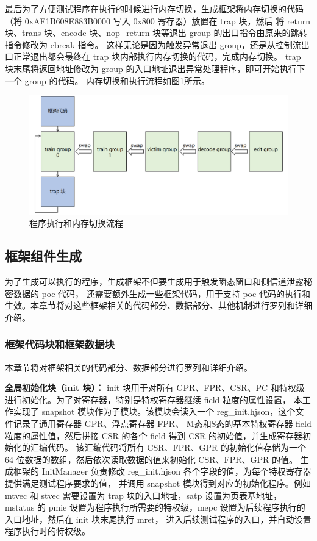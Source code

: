 最后为了方便测试程序在执行的时候进行内存切换，生成框架将内存切换的代码（将 0xAF1B608E883B0000 写入 0x800 寄存器）放置在 trap 块，然后
将 return 块、trans 块、encode 块、nop\_return 块等退出 group 的出口指令由原来的跳转指令修改为 ebreak 指令。
这样无论是因为触发异常退出 group，还是从控制流出口正常退出都会最终在 trap 块内部执行内存切换的代码，完成内存切换。
trap 块末尾将返回地址修改为 group 的入口地址退出异常处理程序，即可开始执行下一个 group 的代码。
内存切换和执行流程如图\ref{paper:execute-flow}所示。\par

\begin{figure}[!h]
    \centering
    \includegraphics[width=\linewidth]{figure/paper/execute-flow.png}
    \caption{程序执行和内存切换流程}
    \label{paper:execute-flow}
\end{figure}

\subsection{框架组件生成}

为了生成可以执行的程序，生成框架不但要生成用于触发瞬态窗口和侧信道泄露秘密数据的 poc 代码，
还需要额外生成一些框架代码，用于支持 poc 代码的执行和生效。本章节将对这些框架相关的代码部分、数据部分、其他机制进行罗列和详细介绍。\par

\subsubsection{框架代码块和框架数据块}
本章节将对框架相关的代码部分、数据部分进行罗列和详细介绍。

\textbf{全局初始化块（init 块）：}
init 块用于对所有 GPR、FPR、CSR、PC 和特权级进行初始化。为了对寄存器，特别是特权寄存器继续 field 粒度的属性设置，
本工作实现了 snapshot 模块作为子模块。该模块会读入一个 reg\_init.hjson，这个文件记录了通用寄存器 GPR、浮点寄存器 FPR、
M态和S态的基本特权寄存器 field 粒度的属性值，然后拼接 CSR 的各个 field 得到 CSR 的初始值，并生成寄存器初始化的汇编代码。
该汇编代码将所有 CSR、FPR、GPR 的初始化值存储为一个 64 位数据的数组，然后依次读取数据的值来初始化 CSR、FPR、GPR 的值。
生成框架的 InitManager 负责修改 reg\_init.hjson 各个字段的值，为每个特权寄存器提供满足测试程序要求的值，
并调用 snapshot 模块得到对应的初始化程序。例如 mtvec 和 stvec 需要设置为 trap 块的入口地址，satp 设置为页表基地址，
mstatus 的 pmie 设置为程序执行所需要的特权级，mepc 设置为后续程序执行的入口地址，然后在 init 块末尾执行 mret，
进入后续测试程序的入口，并自动设置程序执行时的特权级。\par

